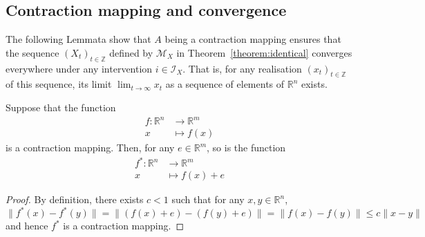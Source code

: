 \subsection{Contraction mapping and convergence}\label{contractionmapping:appendix}

The following Lemmata show that $A$ being a contraction mapping ensures that the sequence $(X_t)_{t\in\mathbb{Z}}$ defined by $\mathcal{M}_X$ in Theorem~\ref{theorem:identical} converges everywhere under any intervention $i\in\mathcal{I}_X$.
That is, for any realisation $(x_t)_{t\in\mathbb{Z}}$ of this sequence, its limit $\lim_{t\rightarrow \infty}x_t$ as a sequence of elements of $\mathbb{R}^n$ exists.



\begin{lemma}\label{lemma:contraction_add}
Suppose that the function
\begin{align*}
f: \mathbb{R}^n & \rightarrow \mathbb{R}^m \\
 x & \mapsto f(x)
\end{align*}
is a contraction mapping.
Then, for any $e \in \mathbb{R}^m$, so is the function
\begin{align*}
f^*: \mathbb{R}^n & \rightarrow \mathbb{R}^m \\
 x & \mapsto f(x) + e
\end{align*}
\end{lemma}
%
\begin{proof}
By definition, there exists $c<1$ such that for any $x,y\in \mathbb{R}^n$,
\[
\| f^*(x)-f^*(y) \| = \| (f(x)+e)-(f(y)+e) \| = \| f(x)-f(y) \| \leq c \| x - y \|
\]
and hence $f^*$ is a contraction mapping.
\end{proof}


